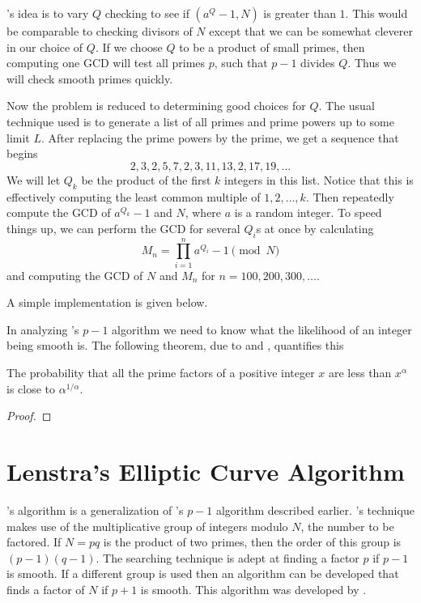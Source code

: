 {\Pollard}'s idea is to vary $Q$ checking to see if $(a^Q - 1, N)$ is greater
than $1$.  This would be comparable to checking divisors of $N$ except
that we can be somewhat cleverer in our choice of $Q$. If we choose $Q$ to
be a product of small primes, then computing one GCD will test all primes
$p$, such that $p - 1$ divides $Q$. Thus we will check smooth primes quickly.

Now the problem is reduced to determining good choices for $Q$.  The usual
technique used is to generate a list of all primes and prime powers up to
some limit $L$.  After replacing the prime powers by the prime, we get a 
sequence that begins
\[
2, 3, 2, 5, 7, 2, 3, 11, 13, 2, 17, 19, \ldots
\]
We will let $Q_k$ be the product of the first $k$ integers in this list.
Notice that this is effectively computing the least common multiple of 
${1, 2, \ldots , k}$.  Then repeatedly compute the GCD of $a^{Q_k} - 1$ and 
$N$, where $a$ is a random integer.  To speed things up, we can perform
the GCD for several $Q_i$s at once by calculating
\[
M_n = \prod_{i=1}^n      a^{Q_i} - 1\pmod{N}
\]
and computing the GCD of $N$ and $M_n$ for $n = 100, 200, 300, \ldots$.

A simple implementation is given below.

In analyzing {\Pollard}'s $p-1$ algorithm we need to know what the
likelihood of an integer being smooth is.  The following theorem, due
to {\Knuth} and {\TrabbPardo} \cite{Knuth76}, quantifies this

\begin{theorem}
The probability that all the prime factors of a positive
integer $x$ are less than $x^\alpha$ is close to $\alpha^{1/\alpha}$.
\end{theorem}

\begin{proof}
\end{proof}

\section{Lenstra's Elliptic Curve Algorithm}

{\LenstraH}'s algorithm is a generalization of {\Pollard}'s $p - 1$ algorithm
described earlier.  {\Pollard}'s technique makes use of the multiplicative
group of integers modulo $N$, the number to be factored.  If $N = pq$ is
the product of two primes, then the order of this group is $(p - 1)(q -
1)$.  The searching technique is adept at finding a factor $p$ if $p - 1$
is smooth.  If a different group is used then an algorithm can be developed
that finds a factor of $N$ if $p + 1$ is smooth.  This algorithm was
developed by {\WilliamsH} \cite{Williams82}.

